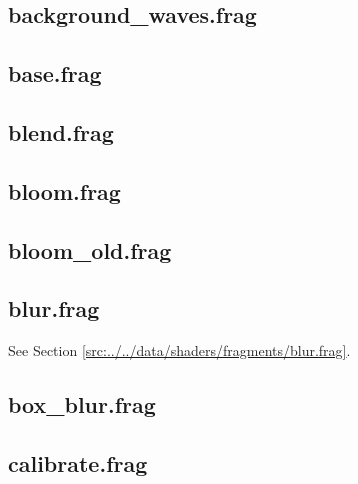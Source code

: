 \documentclass[../main/main.tex]{subfiles}
\begin{document}
\subsection{background\_waves.frag}

\label{src:data/shaders/fragments/background_waves.frag}

\subsection{base.frag}

\label{src:data/shaders/fragments/base.frag}

\subsection{blend.frag}

\label{src:data/shaders/fragments/blend.frag}

\subsection{bloom.frag}

\label{src:data/shaders/fragments/bloom.frag}

\subsection{bloom\_old.frag}

\label{src:data/shaders/fragments/bloom_old.frag}

\subsection{blur.frag}
See Section \ref{src:../../data/shaders/fragments/blur.frag}.

\subsection{box\_blur.frag}

\label{src:data/shaders/fragments/box_blur.frag}

\subsection{calibrate.frag}

\label{src:data/shaders/fragments/calibrate.frag}
\end{document}
